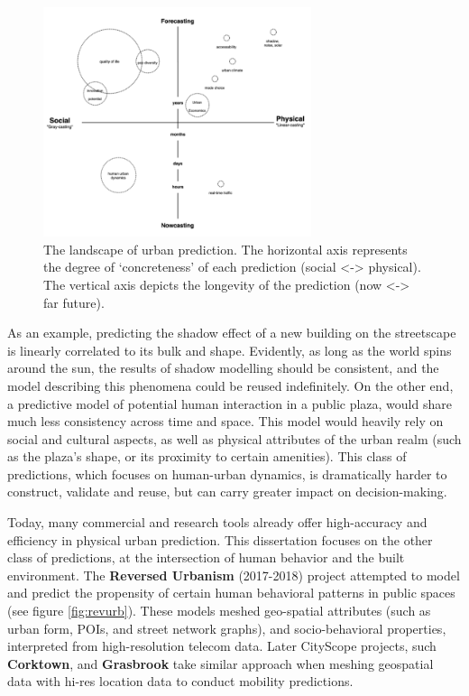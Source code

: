 \begin{figure}[t]
\begin{center}
    \includegraphics[width=0.7\textwidth]{figures/prediction_axes.png}
\end{center}
   \caption{The landscape of urban prediction. The horizontal axis represents the degree of `concreteness' of each prediction (social <-> physical). The vertical axis depicts the longevity of the prediction (now <-> far future).}
\label{fig:axis}
\end{figure}

{As an example, predicting the shadow effect of a new building on the streetscape is linearly correlated to its bulk and shape. Evidently, as long as the world spins around the sun, the results of shadow modelling should be consistent, and the model describing this phenomena could be reused indefinitely. On the other end, a predictive model of potential human interaction in a public plaza, would share much less consistency across time and space. This model would heavily rely on social and cultural aspects, as well as physical attributes of the urban realm (such as the plaza's shape, or its proximity to certain amenities). This class of predictions, which focuses on human-urban dynamics, is dramatically harder to construct, validate and reuse, but can carry greater impact on decision-making.}

{Today, many commercial and research tools already offer high-accuracy and efficiency in physical urban prediction. This dissertation focuses on the other class of predictions, at the intersection of human behavior and the built environment. The \textbf{Reversed Urbanism} (2017-2018) project attempted to model and predict the propensity of certain human behavioral patterns in public spaces
 (see figure \ref{fig:revurb}). These models meshed geo-spatial attributes (such as urban form, POIs, and street network graphs), and socio-behavioral properties, interpreted from high-resolution telecom data. Later CityScope projects, such \textbf{Corktown}, and \textbf{Grasbrook} take similar approach when meshing geospatial data with hi-res location data to conduct mobility predictions.}



